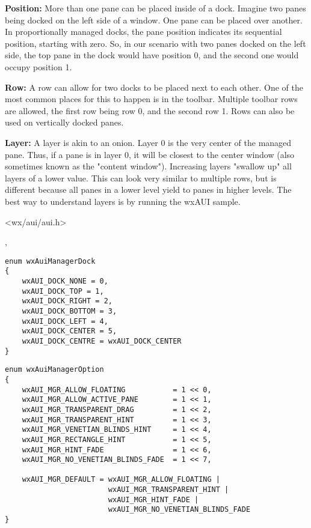 {\bf Position:}
More than one pane can be placed inside of a dock. Imagine two panes
being docked on the left side of a window. One pane can be placed over
another. In proportionally managed docks, the pane position indicates
its sequential position, starting with zero. So, in our scenario with
two panes docked on the left side, the top pane in the dock would have
position 0, and the second one would occupy position 1.

{\bf Row:}
A row can allow for two docks to be placed next to each other. One of
the most common places for this to happen is in the toolbar. Multiple
toolbar rows are allowed, the first row being row 0, and the second
row 1. Rows can also be used on vertically docked panes.

{\bf Layer:}
A layer is akin to an onion. Layer 0 is the very center of the
managed pane. Thus, if a pane is in layer 0, it will be closest to the
center window (also sometimes known as the "content window").
Increasing layers "swallow up" all layers of a lower value. This can
look very similar to multiple rows, but is different because all panes
in a lower level yield to panes in higher levels. The best way to
understand layers is by running the wxAUI sample.




<wx/aui/aui.h>


,


\begin{verbatim}
enum wxAuiManagerDock
{
    wxAUI_DOCK_NONE = 0,
    wxAUI_DOCK_TOP = 1,
    wxAUI_DOCK_RIGHT = 2,
    wxAUI_DOCK_BOTTOM = 3,
    wxAUI_DOCK_LEFT = 4,
    wxAUI_DOCK_CENTER = 5,
    wxAUI_DOCK_CENTRE = wxAUI_DOCK_CENTER
}
\end{verbatim}

\begin{verbatim}
enum wxAuiManagerOption
{
    wxAUI_MGR_ALLOW_FLOATING           = 1 << 0,
    wxAUI_MGR_ALLOW_ACTIVE_PANE        = 1 << 1,
    wxAUI_MGR_TRANSPARENT_DRAG         = 1 << 2,
    wxAUI_MGR_TRANSPARENT_HINT         = 1 << 3,
    wxAUI_MGR_VENETIAN_BLINDS_HINT     = 1 << 4,
    wxAUI_MGR_RECTANGLE_HINT           = 1 << 5,
    wxAUI_MGR_HINT_FADE                = 1 << 6,
    wxAUI_MGR_NO_VENETIAN_BLINDS_FADE  = 1 << 7,

    wxAUI_MGR_DEFAULT = wxAUI_MGR_ALLOW_FLOATING |
                        wxAUI_MGR_TRANSPARENT_HINT |
                        wxAUI_MGR_HINT_FADE |
                        wxAUI_MGR_NO_VENETIAN_BLINDS_FADE
}
\end{verbatim}


